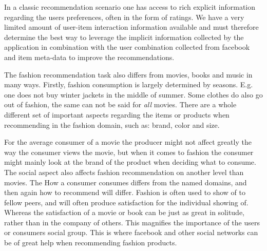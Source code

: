 In a classic recommendation scenario one has access to rich explicit information regarding the users preferences, often in the form of ratings. We have a very limited amount of user-item interaction information available and must therefore determine the best way to leverage the implicit information collected by the application in combination with the user combination collected from facebook and item meta-data to improve the recommendations.

The fashion recommendation task also differs from movies, books and music in many ways.
Firstly, fashion consumption is largely determined by seasons.
E.g. one does not buy winter jackets in the middle of summer.
Some clothes do also go out of fashion, the same can not be said for \emph{all} movies.
There are a whole different set of important aspects regarding the items or products when recommending in the fashion domain, such as: brand, color and size.

For the average consumer of a movie the producer might not affect greatly the way the consumer views the movie, but when it comes to fashion the consumer might mainly look at the brand of the product when deciding what to consume.
The social aspect also affects fashion recommendation on another level than movies.
The %
How a consumer consumes differs from the named domains, and then again how to recommend will differ.
Fashion is often used to show of to fellow peers, and will often produce satisfaction for the individual showing of.
Whereas the satisfaction of a movie or book can be just as great in solitude, rather than in the company of others.
This magnifies the importance of the users or consumers social group.
This is where facebook and other social networks can be of great help when recommending fashion products.


